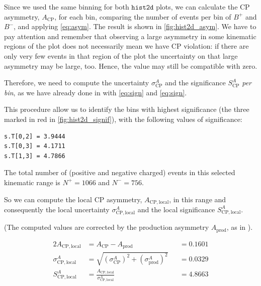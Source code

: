 Since we used the same binning for both $\texttt{hist2d}$ plots, we can calculate the CP asymmetry, $A_{\mathrm{CP}}$, for each bin, comparing the number of events per bin of $B^{+}$ and $B^{-}$, and applying \autoref{eq:asym}. The result is shown in \autoref{fig:hist2d_asym}. We have to pay attention and remember that observing a large asymmetry in some kinematic regions of the plot does not necessarily mean we have CP violation: if there are only very few events in that region of the plot the uncertainty on that large asymmetry may be large, too. Hence, the value may still be compatible with zero.

Therefore, we need to compute the uncertainty
$\sigma_{\mathrm{CP}}^{A}$ and the significance
$S_{\mathrm{CP}}^{A}$ \emph{per bin}, as we have already done in  with \autoref{eq:sign} and \autoref{eq:sign}.

This procedure allow us to identify the bins with highest significance (the three marked in red in \autoref{fig:hist2d_signif}), with the following values of significance:

\newpage
\begin{lstlisting}
s.T[0,2] = 3.9444
s.T[0,3] = 4.1711
s.T[1,3] = 4.7866
\end{lstlisting}

The total number of (positive and negative charged) events in this selected kinematic range is $N^{+}=1066$ and $N^{-}=756$.

So we can compute the local CP asymmetry, $A_{\mathrm{CP, local}}$, in this range and consequently the local uncertainty
$\sigma_{\mathrm{CP, local}}^{A}$ and the local significance
$S_{\mathrm{CP, local}}^{A}$.

(The computed values are corrected by the production asymmetry $A_{\mathrm{prod}}$, as in ).

\begin{alignat}{2}
    A_{\mathrm{CP, local}} &= A_{\mathrm{CP}} - A_{\mathrm{prod}} &&= 0.1601 \\[0.5cm]
    \sigma_{\mathrm{CP, local}}^{A} &= \sqrt{(\sigma_{\mathrm{CP}}^{A})^2 + (\sigma_{\mathrm{prod}}^{A})^2} &&= 0.0329 \\[0.5cm]
    S_{\mathrm{CP, local}}^{A} &= \frac{A_{\mathrm{CP, local}}}{\sigma_{\mathrm{CP, local}}^{A}} &&= 4.8663
\end{alignat}


